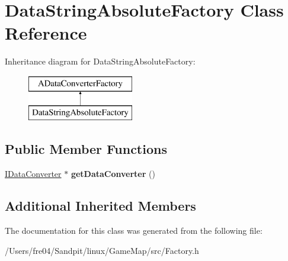 \hypertarget{class_data_string_absolute_factory}{}\section{Data\+String\+Absolute\+Factory Class Reference}
\label{class_data_string_absolute_factory}
Inheritance diagram for Data\+String\+Absolute\+Factory\+:\begin{figure}[H]
\begin{center}
\leavevmode
\includegraphics[height=2.000000cm]{class_data_string_absolute_factory}
\end{center}
\end{figure}
\subsection*{Public Member Functions}
\begin{DoxyCompactItemize}
\item 
\hypertarget{class_data_string_absolute_factory_a975aabe4c2fd6de13b8cc47a2eeb103e}{}\hyperlink{class_i_data_converter}{I\+Data\+Converter} $\ast$ {\bfseries get\+Data\+Converter} ()\label{class_data_string_absolute_factory_a975aabe4c2fd6de13b8cc47a2eeb103e}

\end{DoxyCompactItemize}
\subsection*{Additional Inherited Members}


The documentation for this class was generated from the following file\+:\begin{DoxyCompactItemize}
\item 
/\+Users/fre04/\+Sandpit/linux/\+Game\+Map/src/Factory.\+h\end{DoxyCompactItemize}
